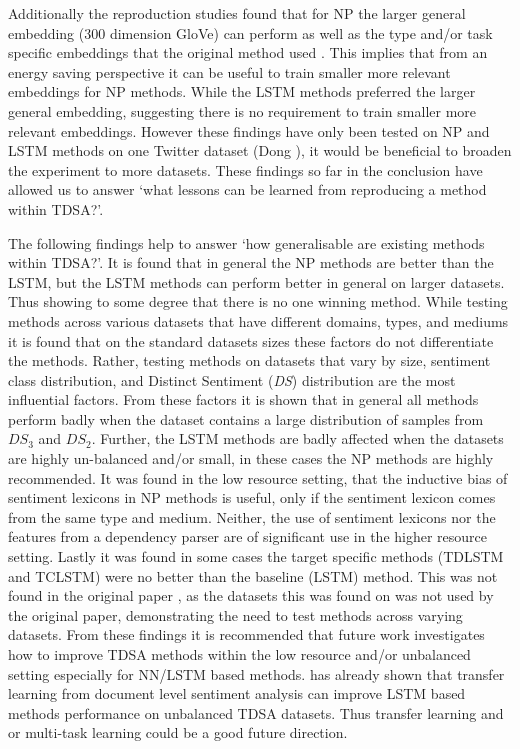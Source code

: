Additionally the reproduction studies found that for NP the larger general embedding (300 dimension GloVe) can perform as well as the type and/or task specific embeddings that the original method used \citep{vo2015target}. This implies that from an energy saving perspective it can be useful to train smaller more relevant embeddings for NP methods. While the LSTM methods preferred the larger general embedding, suggesting there is no requirement to train smaller more relevant embeddings. However these findings have only been tested on NP and LSTM methods on one Twitter dataset (Dong \citep{dong-etal-2014-adaptive}), it would be beneficial to broaden the experiment to more datasets. These findings so far in the conclusion have allowed us to answer  `what lessons can be learned from reproducing a method within TDSA?’.

The following findings help to answer  `how generalisable are existing methods within TDSA?'. It is found that in general the NP methods are better than the LSTM, but the LSTM methods can perform better in general on larger datasets. Thus showing to some degree that there is no one winning method. While testing methods across various datasets that have different domains, types, and mediums it is found that on the standard datasets sizes these factors do not differentiate the methods. Rather, testing methods on datasets that vary by size, sentiment class distribution, and Distinct Sentiment (\textit{DS}) distribution are the most influential factors. From these factors it is shown that in general all methods perform badly when the dataset contains a large distribution of samples from $DS_3$ and $DS_2$. Further, the LSTM methods are badly affected when the datasets are highly un-balanced and/or small, in these cases the NP methods are highly recommended. It was found in the low resource setting, that the inductive bias of sentiment lexicons in NP methods is useful, only if the sentiment lexicon comes from the same type and medium. Neither, the use of sentiment lexicons nor the features from a dependency parser are of significant use in the higher resource setting. Lastly it was found in some cases the target specific methods (TDLSTM and TCLSTM) were no better than the baseline (LSTM) method. This was not found in the original paper \citep{tang-etal-2016-effective}, as the datasets this was found on was not used by the original paper, demonstrating the need to test methods across varying datasets. From these findings it is recommended that future work investigates how to improve TDSA methods within the low resource and/or unbalanced setting especially for NN/LSTM based methods. \citet{he-etal-2018-exploiting} has already shown that transfer learning from document level sentiment analysis can improve LSTM based methods performance on unbalanced TDSA datasets. Thus transfer learning and or multi-task learning could be a good future direction. 

